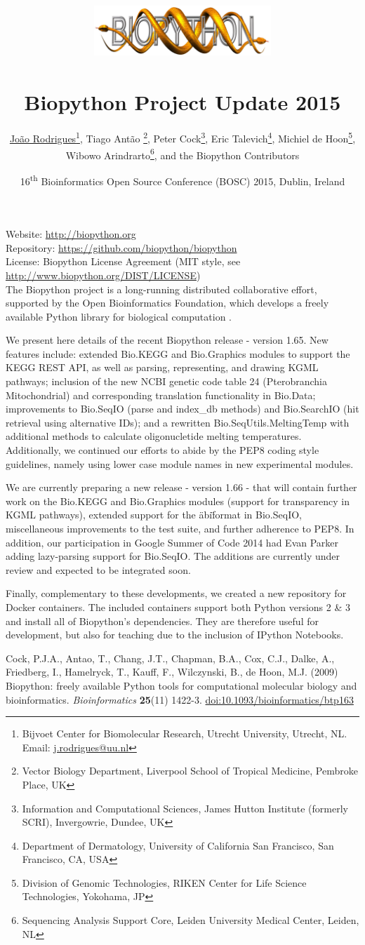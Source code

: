 \documentclass[10pt,oneside]{article}
\title{%
\vspace{-1.5in}
\includegraphics[width=0.5\textwidth]{biopython.jpg}\\
~\\Biopython Project Update 2015}
\author{
    \underline{Jo\~{a}o Rodrigues}\footnote{Bijvoet Center for Biomolecular Research, Utrecht University, Utrecht, NL. Email: \href{mailto:j.rodrigues@uu.nl}{j.rodrigues@uu.nl}},
    Tiago Ant\~{a}o \footnote{Vector Biology Department, Liverpool School of Tropical Medicine, Pembroke Place, UK},
    Peter Cock\footnote{Information and Computational Sciences, James Hutton Institute (formerly SCRI), Invergowrie, Dundee, UK},
    Eric Talevich\footnote{Department of Dermatology, University of California San Francisco, San Francisco, CA, USA},
    Michiel de Hoon\footnote{Division of Genomic Technologies, RIKEN Center for Life Science Technologies, Yokohama, JP},
		\\
    Wibowo Arindrarto\footnote{Sequencing Analysis Support Core, Leiden University Medical Center, Leiden, NL},
    and the Biopython Contributors}
\date{16\textsuperscript{th} Bioinformatics Open Source Conference (BOSC) 2015, Dublin, Ireland}
\begin{document}
\maketitle
\thispagestyle{empty}

\vspace{-0.2in}
\noindent
Website: \url{http://biopython.org} \\
Repository: \url{https://github.com/biopython/biopython} \\
License: Biopython License Agreement (MIT style, see \url{http://www.biopython.org/DIST/LICENSE}) \\

The Biopython project is a long-running distributed collaborative effort, 
supported by the Open Bioinformatics Foundation, which develops a freely 
available Python library for biological computation \cite{AppNote}.

We present here details of the recent Biopython release - version 1.65. New 
features include: extended Bio.KEGG and Bio.Graphics modules to support the 
KEGG REST API, as well as parsing, representing, and drawing KGML pathways; 
inclusion of the new NCBI genetic code table 24 (Pterobranchia Mitochondrial) 
and corresponding translation functionality in Bio.Data; improvements to 
Bio.SeqIO (parse and index\_db methods) and Bio.SearchIO (hit retrieval using alternative IDs); 
and a rewritten Bio.SeqUtils.MeltingTemp with additional methods to calculate oligonucletide
melting temperatures.
Additionally, we continued our efforts to abide by the PEP8 coding style guidelines, 
namely using lower case module names in new experimental modules.

We are currently preparing a new release - version 1.66 - that will contain 
further work on the Bio.KEGG and Bio.Graphics modules (support for transparency 
in KGML pathways), extended support for the \"abi\" format in Bio.SeqIO, 
miscellaneous improvements to the test suite, and further adherence to PEP8. In addition, 
our participation in Google Summer of Code 2014 had Evan Parker adding lazy-parsing support for 
Bio.SeqIO. The additions are currently under review and expected to be integrated soon.

Finally, complementary to these developments, we created a new repository for Docker
containers. The included containers support both Python versions 2 
\& 3 and install all of Biopython's dependencies. They are therefore useful for 
development, but also for teaching due to the inclusion of IPython Notebooks.

\begin{thebibliography}{}

Cock, P.J.A., Antao, T., Chang, J.T., Chapman, B.A., Cox, C.J., Dalke, A., Friedberg, I., Hamelryck, T., Kauff, F., Wilczynski, B., de Hoon, M.J. (2009) Biopython: freely available Python tools for computational molecular biology and bioinformatics. {\it Bioinformatics} {\bf 25}(11) 1422-3. \href{http://dx.doi.org/10.1093/bioinformatics/btp163}{doi:10.1093/bioinformatics/btp163}

\end{thebibliography}
\end{document}
